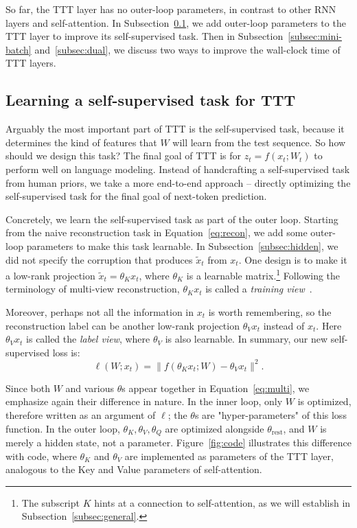 \documentclass{article}
\begin{document}
So far, the TTT layer has no outer-loop parameters, in contrast to other RNN layers and self-attention.
In Subsection~\ref{subsec:task}, we add outer-loop parameters to the TTT layer to improve its self-supervised task. 
Then in Subsection~\ref{subsec:mini-batch} and~\ref{subsec:dual}, we discuss two ways to improve the wall-clock time of TTT layers.



\subsection{Learning a self-supervised task for TTT}
\label{subsec:task}
Arguably the most important part of TTT is the self-supervised task, because it determines the kind of features that $W$ will learn from the test sequence.
So how should we design this task?
The final goal of TTT is for $z_t = f(x_t; W_t)$ to perform well on language modeling.
Instead of handcrafting a self-supervised task from human priors, we take a more end-to-end approach -- directly optimizing the self-supervised task for the final goal of next-token prediction.

Concretely, we learn the self-supervised task as part of the outer loop.
Starting from the naive reconstruction task in Equation~\ref{eq:recon}, we add some outer-loop parameters to make this task learnable.
In Subsection~\ref{subsec:hidden}, we did not specify the corruption that produces $\tilde{x}_t$ from $x_t$. One design is to make it a low-rank projection $\tilde{x}_t = \theta_Kx_t$, where $\theta_K$ is a learnable matrix.\footnote{\label{footnote:4}
The subscript $K$ hints at a connection to self-attention, as we will establish in Subsection~\ref{subsec:general}.
}
Following the terminology of multi-view reconstruction, $\theta_Kx_t$ is called a \emph{training view}~\cite{chen2020improved}.

Moreover, perhaps not all the information in $x_t$ is worth remembering, so the reconstruction label can be another low-rank projection $\theta_Vx_t$ instead of $x_t$.
Here $\theta_Vx_t$ is called the \emph{label view}, where $\theta_V$ is also learnable.
In summary, our new self-supervised loss is:
\begin{equation}
\label{eq:multi}
\ell(W; x_t) = \big\| f\left(\theta_K x_t; W\right) - \theta_V x_t \big\|^2.
\end{equation}

Since both $W$ and various $\theta$s appear together in Equation~\ref{eq:multi}, we emphasize again their difference in nature. 
In the inner loop, only $W$ is optimized, therefore written as an argument of $\ell$; the $\theta$s are "hyper-parameters" of this loss function.
In the outer loop, $\theta_K,\theta_V,\theta_Q$ are optimized alongside $\theta_\text{rest}$, and $W$ is merely a hidden state, not a parameter.
Figure~\ref{fig:code} illustrates this difference with code, where $\theta_K$ and $\theta_V$ are implemented as parameters of the TTT layer, 
analogous to the Key and Value parameters of self-attention.
\end{document}
